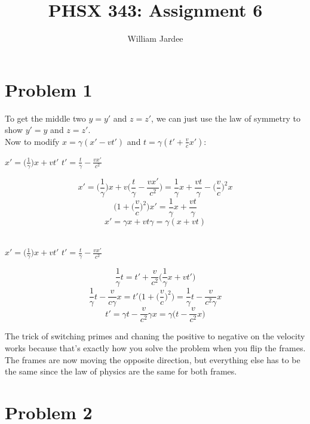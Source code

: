 \documentclass[11pt]{article}
\begin{document}
\date{}

\title{PHSX 343: Assignment 6}

\author{William Jardee}

\maketitle


\section*{Problem 1}
    To get the middle two $y=y'$ and $z=z'$, we can just use the law of symmetry to show $y'=y$ and $z=z'$.\\
    Now to modify $x=\gamma (x'-vt')$ and $t = \gamma (t'+\frac{v}{c}x')$:
    \begin{center}
        $x' = \Big(\frac{1}{\gamma}\Big)x +vt'$ \quad $t' = \frac{t}{\gamma} - \frac{vx'}{c^2}$
    \end{center}
    \[x' = \Big(\frac{1}{\gamma}\Big)x + v\Big(\frac{t}{\gamma}-\frac{vx'}{c^2}\Big) = \frac{1}{\gamma}x +\frac{vt}{\gamma} - \Big(\frac{v}{c}\Big)^2 x\]
    \[\Big(1+\Big(\frac{v}{c}\Big)^2\Big)x' = \frac{1}{\gamma}x +\frac{vt}{\gamma}\]
    \[x' = \gamma x +vt\gamma = \gamma(x+vt)\]\\
    
    \begin{center}
        $x' = \Big(\frac{1}{\gamma}\Big)x +vt'$ \quad $t' = \frac{t}{\gamma} - \frac{vx'}{c^2}$
    \end{center}
    \[\frac{1}{\gamma} t = t' +\frac{v}{c^2}\Big(\frac{1}{\gamma}x +vt'\Big)\]
    \[\frac{1}{\gamma}t -\frac{v}{c\gamma}x = t'\Big(1 +\Big(\frac{v}{c}\Big)^2\Big) = \frac{1}{\gamma}t - \frac{v}{c^2 \gamma}x\]
    \[t' = \gamma t -\frac{v}{c^2}\gamma x = \gamma \Big( t - \frac{v}{c^2}x\Big)\]
    
    The trick of switching primes and chaning the positive to negative on the velocity works because that's exactly how you solve the problem when you flip the frames. The frames are now moving the opposite direction, but everything else has to be the same since the law of physics are the same for both frames. 

\section*{Problem 2}
\end{document}
